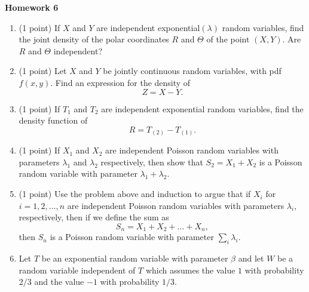 \documentclass[10pt,twoside]{article}\usepackage[]{graphicx}\usepackage[dvipsnames,svgnames,table]{xcolor}
\begin{document}
\begin{flushright}
\begin{minipage}{.33\textwidth}
\rightline{\today}
\end{minipage}
\end{flushright}

\begin{center}
{\large{\textbf{Homework 6}}}
\end{center}

\begin{enumerate}


    \item (1 point) If $X$ and $Y$ are independent exponential$(\lambda)$ random variables, find the joint density of the polar coordinates $R$ and $\Theta$ of the point $(X, Y)$. Are $R$ and $\Theta$ independent? 

    \item (1 point) Let $X$ and $Y$ be jointly continuous random variables, with pdf $f(x, y)$. Find an expression for the density of 
    $$
    Z = X - Y.
    $$

    \item (1 point) If $T_1$ and $T_2$ are independent exponential random variables, find the density function of
    $$
    R = T_{(2)} - T_{(1)}.
    $$

    \item (1 point) If $X_1$ and $X_2$ are independent Poisson random variables with parameters $\lambda_1$ and $\lambda_2$ respectively, then show that $S_2 = X_1 + X_2$ is a Poisson random variable with parameter $\lambda_1 + \lambda_2$.

    \item (1 point) Use the problem above and induction to argue that if $X_i$ for $i = 1, 2, \ldots, n$ are independent Poisson random variables with parameters $\lambda_i$, respectively, then if we define the sum as
    $$
    S_n = X_1 + X_2 + \ldots + X_n,
    $$
    then $S_n$ is a Poisson random variable with parameter $\sum_i \lambda_i$.
    

    \item Let $T$ be an exponential random variable with parameter $\beta$ and let $W$ be a random variable independent of $T$ which assumes the value $1$ with probability $2/3$ and the value $-1$ with probability $1/3$. 
    

\end{enumerate}
\end{document}
